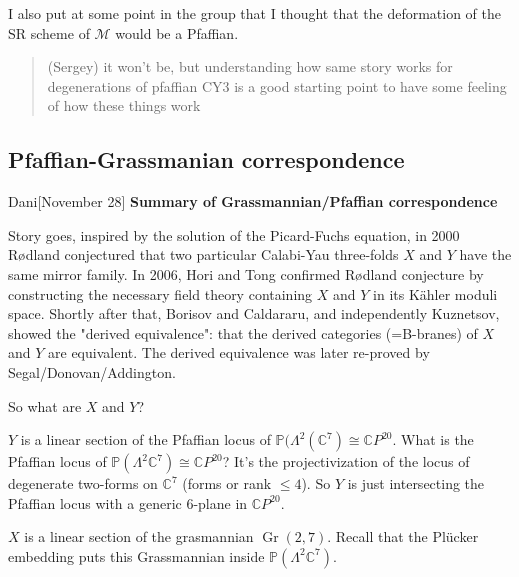 I also put at some point in the group that {\color{14}I thought that the deformation of the SR scheme of $\mathcal{M}$ would be a Pfaffian.}

{\color{5}\begin{quotation}
		(Sergey)\hspace{1em}	it won't be, but understanding how same story works for degenerations of pfaffian CY3 is a good starting point to have some feeling of how these things work
\end{quotation}}

\subsection{Pfaffian-Grassmanian correspondence}

\begin{thing3}{Dani}[November 28]\label{summary-pfgr}\leavevmode
	\textbf{Summary of Grassmannian/Pfaffian correspondence}

	Story goes, inspired by the solution of the Picard-Fuchs equation, in 2000 Rødland conjectured that two particular Calabi-Yau three-folds $X$ and $Y$ have the same mirror family. In 2006, Hori and Tong confirmed Rødland conjecture by constructing the necessary field theory containing $X$ and $Y$ in its Kähler moduli space. Shortly after that, Borisov and Caldararu, and independently Kuznetsov, showed the "derived equivalence": that the derived categories (=B-branes) of $X$ and $Y$ are equivalent. The derived equivalence was later re-proved by Segal/Donovan/Addington.

	So what are $X$ and $Y$?

$Y$ is a linear section of the Pfaffian locus of $\mathbb{P}(\Lambda^{2}(\mathbb{C}^7)\cong \mathbb{C}P^{20}$. What is the Pfaffian locus of $\mathbb{P}(\Lambda^{2}\mathbb{C}^7)\cong \mathbb{C}P^{20}$? It's the projectivization of the locus of degenerate two-forms on $\mathbb{C}^7$ (forms or rank $\leq 4$). So $Y$ is just intersecting the Pfaffian locus with a generic 6-plane in $\mathbb{C}P^{20}$. 



	$X$ is a linear section of the grasmannian $\operatorname{Gr}(2,7)$. Recall that the Plücker embedding puts this Grassmannian inside $\mathbb{P}(\Lambda^{2}\mathbb{C}^7)$.


\end{thing3}
